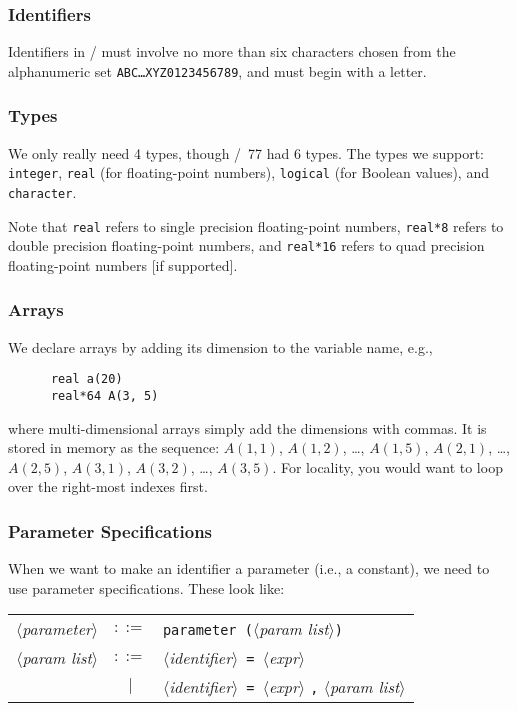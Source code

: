 \subsubsection*{Identifiers}
Identifiers in \FORTRAN/ must involve no more than six characters chosen
from the alphanumeric set \texttt{ABC\dots XYZ0123456789}, and must
begin with a letter.

\subsubsection*{Types}
We only really need 4 types, though \FORTRAN/~77 had 6 types. The types
we support: \texttt{integer}, \texttt{real} (for floating-point
numbers), \texttt{logical} (for Boolean values), and \texttt{character}.

Note that \texttt{real} refers to single precision floating-point
numbers, \texttt{real*8} refers to double precision floating-point
numbers, and \texttt{real*16} refers to quad precision floating-point
numbers [if supported].

\subsubsection*{Arrays}
We declare arrays by adding its dimension to the variable name, e.g.,
\begin{lstlisting}
      real a(20)
      real*64 A(3, 5)
\end{lstlisting}
where multi-dimensional arrays simply add the dimensions with commas. It
is stored in memory as the sequence: $A(1,1)$, $A(1,2)$, \dots,
$A(1,5)$, $A(2,1)$, \dots, $A(2,5)$, $A(3,1)$, $A(3,2)$, \dots, $A(3,5)$.
For locality, you would want to loop over the right-most indexes first.

\subsubsection{Parameter Specifications}
When we want to make an identifier a parameter (i.e., a constant), we
need to use parameter specifications. These look like:

\begin{tabular}{rcl}
$\langle$\textit{parameter\/}$\rangle$ & $::=$ &
\texttt{parameter (}$\langle$\textit{param list\/}$\rangle$\texttt{)}\\
$\langle$\textit{param list\/}$\rangle$ & $::=$ & $\langle$\textit{identifier\/}$\rangle$\texttt{ = }$\langle$\textit{expr\/}$\rangle$\\
&$\mid$ & $\langle$\textit{identifier\/}$\rangle$\texttt{ = }$\langle$\textit{expr\/}$\rangle$
\texttt{,} $\langle$\textit{param list\/}$\rangle$
\end{tabular}


